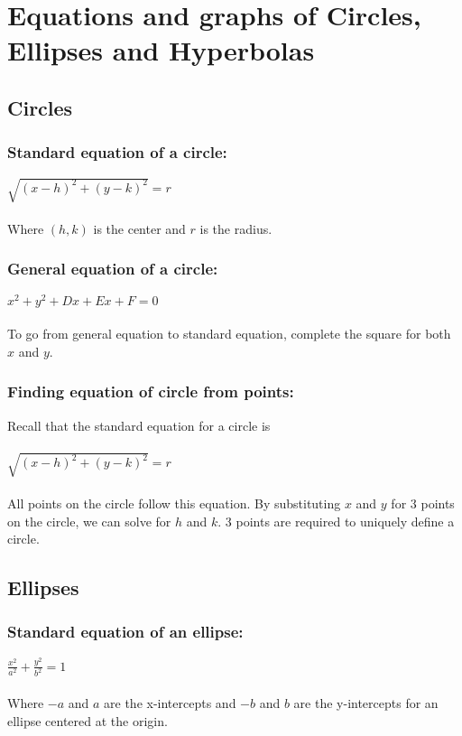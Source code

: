 \section{Equations and graphs of Circles, Ellipses and Hyperbolas}\label{sec:equations-and-graphs-of-circles,-ellipses-and-hyperbolas}

\subsection{Circles}\label{subsec:circles}

\subsubsection{Standard equation of a circle:}
$\sqrt{(x-h)^2 + (y-k)^2}= r$ \\ \\
Where $(h,k)$ is the center and $r$ is the radius.

\subsubsection{General equation of a circle:}
$x^2 + y^2 + Dx + Ex + F = 0$ \\ \\
To go from general equation to standard equation, complete the square for both $x$ and $y$.

\subsubsection{Finding equation of circle from points:}
Recall that the standard equation for a circle is \\ \\
$\sqrt{(x-h)^2 + (y-k)^2}= r$ \\ \\
All points on the circle follow this equation.
By substituting $x$ and $y$ for 3 points on the circle, we can solve for $h$ and $k$.
3 points are required to uniquely define a circle.

\subsection{Ellipses}\label{subsec:ellipses}

\subsubsection{Standard equation of an ellipse:}
$\frac{x^2}{a^2}+ \frac{y^2}{b^2}= 1$ \\ \\
Where $-a$ and $a$ are the x-intercepts and $-b$ and $b$ are the y-intercepts for an ellipse centered at the origin.

